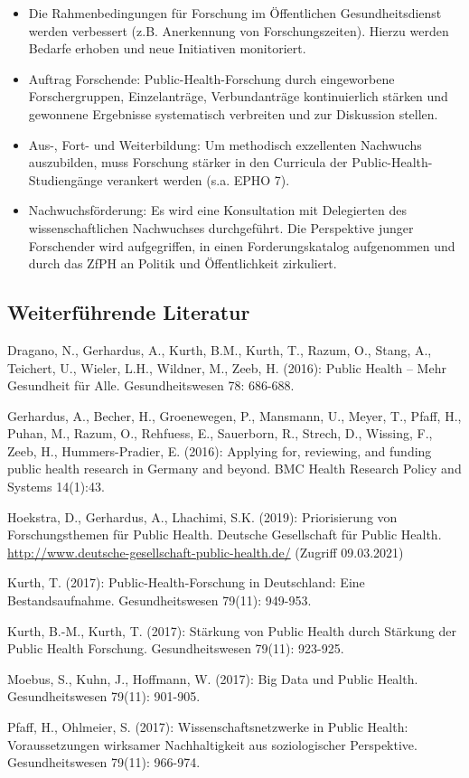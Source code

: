\documentclass{article}
\begin{document}
\begin{itemize}
\item Die Rahmenbedingungen für Forschung im Öffentlichen Gesundheitsdienst werden verbessert (z.B. Anerkennung von Forschungszeiten). Hierzu werden Bedarfe erhoben und neue Initiativen monitoriert. 


\item Auftrag Forschende: Public-Health-Forschung durch eingeworbene Forschergruppen, Einzelanträge, Verbundanträge kontinuierlich stärken und gewonnene Ergebnisse systematisch verbreiten und zur Diskussion stellen.


\item Aus-, Fort- und Weiterbildung: Um methodisch exzellenten Nachwuchs auszubilden, muss Forschung stärker in den Curricula der Public-Health-Studiengänge verankert werden (s.a. EPHO 7).


\item Nachwuchsförderung: Es wird eine Konsultation mit Delegierten des wissenschaftlichen Nachwuchses durchgeführt. Die Perspektive junger Forschender wird aufgegriffen, in einen Forderungskatalog aufgenommen und durch das ZfPH an Politik und Öffentlichkeit zirkuliert. 


\end{itemize}

\subsection{Weiterführende Literatur}\label{H5137609}



Dragano, N., Gerhardus, A., Kurth, B.M., Kurth, T., Razum, O., Stang, A., Teichert, U., Wieler, L.H., Wildner, M., Zeeb, H. (2016): Public Health – Mehr Gesundheit für Alle. Gesundheitswesen 78: 686-688.


Gerhardus, A., Becher, H., Groenewegen, P., Mansmann, U., Meyer, T., Pfaff, H., Puhan, M., Razum, O., Rehfuess, E., Sauerborn, R., Strech, D., Wissing, F., Zeeb, H., Hummers-Pradier, E. (2016): Applying for, reviewing, and funding public health research in Germany and beyond. BMC Health Research Policy and Systems 14(1):43.


Hoekstra, D., Gerhardus, A., Lhachimi, S.K. (2019): Priorisierung von Forschungsthemen für Public Health. Deutsche Gesellschaft für Public Health. \href{http://www.deutsche-gesellschaft-public-health.de/}{http://www.deutsche-gesellschaft-public-health.de/} (Zugriff 09.03.2021)


Kurth, T. (2017): Public-Health-Forschung in Deutschland: Eine Bestandsaufnahme. Gesundheitswesen 79(11): 949-953.


Kurth, B.-M., Kurth, T. (2017): Stärkung von Public Health durch Stärkung der Public Health Forschung. Gesundheitswesen 79(11): 923-925.


Moebus, S., Kuhn, J., Hoffmann, W. (2017): Big Data und Public Health. Gesundheitswesen 79(11): 901-905.


Pfaff, H., Ohlmeier, S. (2017): Wissenschaftsnetzwerke in Public Health: Voraussetzungen wirksamer Nachhaltigkeit aus soziologischer Perspektive. Gesundheitswesen 79(11): 966-974.
\end{document}
